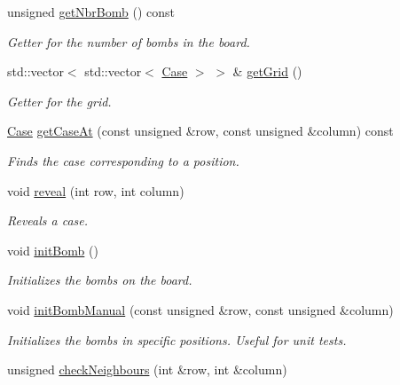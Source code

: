 \begin{DoxyCompactItemize}
\mbox{\label{class_board_a71e5a8193ee2be9de3b369d47efb1d5e}} 
unsigned \hyperlink{class_board_a71e5a8193ee2be9de3b369d47efb1d5e}{get\+Nbr\+Bomb} () const
\begin{DoxyCompactList}\small\item\em Getter for the number of bombs in the board. \end{DoxyCompactList}\item 
std\+::vector$<$ std\+::vector$<$ \hyperlink{class_case}{Case} $>$ $>$ \& \hyperlink{class_board_a15ae2a1e56e7a0c97a239a5311a1eb53}{get\+Grid} ()
\begin{DoxyCompactList}\small\item\em Getter for the grid. \end{DoxyCompactList}\item 
\hyperlink{class_case}{Case} \hyperlink{class_board_a24b99110a6a311dd122cabeeb63e81d8}{get\+Case\+At} (const unsigned \&row, const unsigned \&column) const
\begin{DoxyCompactList}\small\item\em Finds the case corresponding to a position. \end{DoxyCompactList}\item 
void \hyperlink{class_board_a4b0f58dcf0a552e80a9ca012e763d856}{reveal} (int row, int column)
\begin{DoxyCompactList}\small\item\em Reveals a case. \end{DoxyCompactList}\item 
\mbox{\label{class_board_ac800c9dafe0e7002caeb67d042360ec0}} 
void \hyperlink{class_board_ac800c9dafe0e7002caeb67d042360ec0}{init\+Bomb} ()
\begin{DoxyCompactList}\small\item\em Initializes the bombs on the board. \end{DoxyCompactList}\item 
void \hyperlink{class_board_a4e4962f91b8258edc7be50714a3c5668}{init\+Bomb\+Manual} (const unsigned \&row, const unsigned \&column)
\begin{DoxyCompactList}\small\item\em Initializes the bombs in specific positions. Useful for unit tests. \end{DoxyCompactList}\item 
unsigned \hyperlink{class_board_a607be54a79b42d895fe89e62b4f88577}{check\+Neighbours} (int \&row, int \&column)

\end{DoxyCompactItemize}
